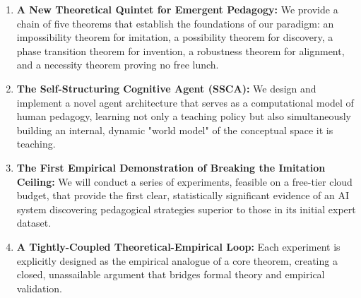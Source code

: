 \begin{enumerate}
    \item \textbf{A New Theoretical Quintet for Emergent Pedagogy:} We provide a chain of five theorems that establish the foundations of our paradigm: an impossibility theorem for imitation, a possibility theorem for discovery, a phase transition theorem for invention, a robustness theorem for alignment, and a necessity theorem proving no free lunch.
    \item \textbf{The Self-Structuring Cognitive Agent (SSCA):} We design and implement a novel agent architecture that serves as a computational model of human pedagogy, learning not only a teaching policy but also simultaneously building an internal, dynamic "world model" of the conceptual space it is teaching.
    \item \textbf{The First Empirical Demonstration of Breaking the Imitation Ceiling:} We will conduct a series of experiments, feasible on a free-tier cloud budget, that provide the first clear, statistically significant evidence of an AI system discovering pedagogical strategies superior to those in its initial expert dataset.
    \item \textbf{A Tightly-Coupled Theoretical-Empirical Loop:} Each experiment is explicitly designed as the empirical analogue of a core theorem, creating a closed, unassailable argument that bridges formal theory and empirical validation.
\end{enumerate}
